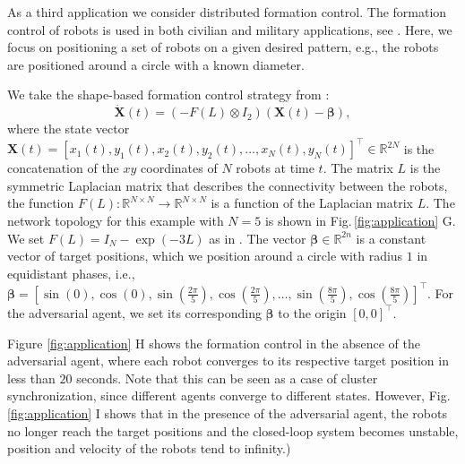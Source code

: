 \documentclass[%
 reprint,
 amsmath,amssymb,
 aip,
]{revtex4-2}
\def \bX {\pmb{X}}
\def \bbeta {\pmb{\beta}}
\theoremstyle{italichead}
\theoremstyle{definition}
\begin{document}
{As a third application we consider  distributed formation control. %
The formation control of robots is used in both civilian and military applications, see \cite{oh2015survey,wang2021formation,yu2022decentralized}.
Here, we focus on positioning a set of robots  on a given desired pattern, e.g., the robots are positioned around a circle with a known diameter.

We take the shape-based formation control strategy from \cite{Morbidi2022Functions}:
\begin{equation} \label{Eq_formation_control}
    \dot{\bX} (t) = (- F(L) \otimes I_2 ) (\bX(t) - \bbeta),
\end{equation}
where the state vector $\bX(t) = [x_1(t), y_1 (t), x_2 (t), y_2 (t), \hdots, x_N (t), y_N (t)]^\top \in \mathbb{R}^{2N}$ is the concatenation of the $xy$ coordinates of $N$ robots at time $t$.
The matrix $L$ is the symmetric Laplacian matrix that describes the connectivity between the robots, the function $F(L): \mathbb{R}^{N \times N} \to \mathbb{R}^{N \times N}$ is a function of the Laplacian matrix $L$.
The network topology for this example with $N=5$ is shown in Fig.\,\ref{fig:application} G.
We set $F(L) = I_N - \exp (-3L)$ as in  \cite{Morbidi2022Functions}.
The vector $\bbeta \in \mathbb{R}^{2n}$ is a constant vector of target positions, which we
 position around a circle with radius $1$ in equidistant phases, i.e., $\bbeta = [\sin (0), \cos (0), \sin (\frac{2 \pi}{5}), \cos (\frac{2 \pi}{5}),\hdots, \sin (\frac{8 \pi}{5}), \cos (\frac{8 \pi}{5})]^\top$.
For the adversarial agent, we set its corresponding $\bbeta$ to the origin $[0,0]^\top$.




Figure \ref{fig:application} H shows the formation control in the absence of the adversarial agent, where each robot converges to its respective target position in less than $20$ seconds. Note that this can be seen as a case of cluster synchronization, since different agents converge to different states.
However, Fig.\,\ref{fig:application} I shows that in the presence of the adversarial agent, the robots no longer reach the target positions and the closed-loop system becomes unstable, position and velocity of the robots tend to infinity.)





}
\end{document}
